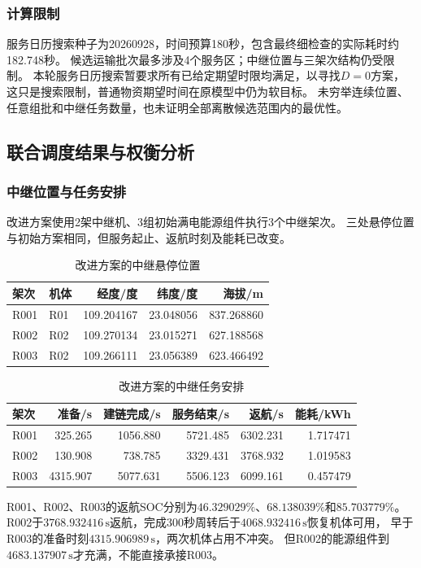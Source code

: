 \documentclass[bwprint]{gmcmthesis}
\begin{document}
\subsubsection{计算限制}
服务日历搜索种子为20260928，时间预算180秒，包含最终细检查的实际耗时约182.748秒。
候选运输批次最多涉及4个服务区；中继位置与三架次结构仍受限制。
本轮服务日历搜索暂要求所有已给定期望时限均满足，以寻找$D=0$方案，
这只是搜索限制，普通物资期望时间在原模型中仍为软目标。
未穷举连续位置、任意组批和中继任务数量，也未证明全部离散候选范围内的最优性。

\subsection{联合调度结果与权衡分析}
\subsubsection{中继位置与任务安排}
改进方案使用2架中继机、3组初始满电能源组件执行3个中继架次。
三处悬停位置与初始方案相同，但服务起止、返航时刻及能耗已改变。
\begin{table}[htbp]
\centering
\small
\caption{改进方案的中继悬停位置}
\label{tab:q3_locations}
\begin{tabular}{llrrr}
\toprule
架次 & 机体 & 经度/度 & 纬度/度 & 海拔/m \\
\midrule
R001 & R01 & 109.204167 & 23.048056 & 837.268860 \\
R002 & R02 & 109.270134 & 23.015271 & 627.188568 \\
R003 & R02 & 109.266111 & 23.056389 & 623.466492 \\
\bottomrule
\end{tabular}
\end{table}
\begin{table}[htbp]
\centering
\small
\caption{改进方案的中继任务安排}
\label{tab:q3_relay_schedule}
\begin{tabular}{lrrrrr}
\toprule
架次 & 准备/s & 建链完成/s & 服务结束/s & 返航/s & 能耗/kWh \\
\midrule
R001 & 325.265 & 1056.880 & 5721.485 & 6302.231 & 1.717471 \\
R002 & 130.908 & 738.785 & 3329.431 & 3768.932 & 1.019583 \\
R003 & 4315.907 & 5077.631 & 5506.123 & 6099.161 & 0.457479 \\
\bottomrule
\end{tabular}
\end{table}

R001、R002、R003的返航SOC分别为$46.329029\%$、$68.138039\%$和$85.703779\%$。
R002于$3768.932416\,\mathrm{s}$返航，完成300秒周转后于$4068.932416\,\mathrm{s}$恢复机体可用，
早于R003的准备时刻$4315.906989\,\mathrm{s}$，两次机体占用不冲突。
但R002的能源组件到$4683.137907\,\mathrm{s}$才充满，不能直接承接R003。
\end{document}
